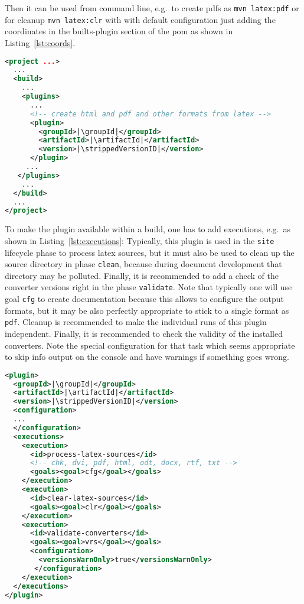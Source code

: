 Then it can be used from command line,
e.g.~to create pdfs as \texttt{mvn latex:pdf}
or for cleanup \texttt{mvn latex:clr} with with default configuration
just adding the coordinates in the builts-plugin section of the pom
as shown in Listing~\ref{lst:coords}. 
%
\begin{lstlisting}[language=xml, basicstyle=\footnotesize,
escapechar=|,
float, captionpos=b, label={lst:coords}, 
caption={The coordinates of this plugin}]
<project ...>
  ...
  <build>
    ...
    <plugins>
      ...
      <!-- create html and pdf and other formats from latex -->
      <plugin>
        <groupId>|\groupId|</groupId>
        <artifactId>|\artifactId|</artifactId>
        <version>|\strippedVersionID|</version>
      </plugin>
     ...
   </plugins>
    ...
  </build>
  ...
</project>
\end{lstlisting}


To make the plugin available within a build,
one has to add executions, e.g.~as shown in Listing~\ref{lst:executions}:
Typically, this plugin is used in the \texttt{site} lifecycle phase 
to process latex sources,
but it must also be used to clean up the source directory
in phase \texttt{clean},
because during document development that directory may be polluted.
Finally, it is recommended to add a check of the converter versions
right in the phase \texttt{validate}.
Note that typically one will use goal \texttt{cfg}
to create documentation because this allows to configure the output formats,
but it may be also perfectly appropriate to stick to a single format
as \texttt{pdf}.
Cleanup is recommended to make the individual runs of this plugin independent.
Finally, it is recommended to check the validity of the installed converters.
Note the special configuration for that task
which seems appropriate to skip info output on the console
and have warnings if something goes wrong. 


\begin{lstlisting}[language=XML, basicstyle=\footnotesize,
escapechar=|,
float, captionpos=hb, label={lst:executions}, 
caption={The executions of this plugin}]
<plugin>
  <groupId>|\groupId|</groupId>
  <artifactId>|\artifactId|</artifactId>
  <version>|\strippedVersionID|</version>
  <configuration>
  ...
  </configuration>
  <executions>
    <execution>
      <id>process-latex-sources</id>
      <!-- chk, dvi, pdf, html, odt, docx, rtf, txt -->
      <goals><goal>cfg</goal></goals>
    </execution>
    <execution>
      <id>clear-latex-sources</id>
      <goals><goal>clr</goal></goals>
    </execution>
    <execution>
      <id>validate-converters</id>
      <goals><goal>vrs</goal></goals>
      <configuration>
        <versionsWarnOnly>true</versionsWarnOnly>
       </configuration>
    </execution>
  </executions>
</plugin>
\end{lstlisting}

